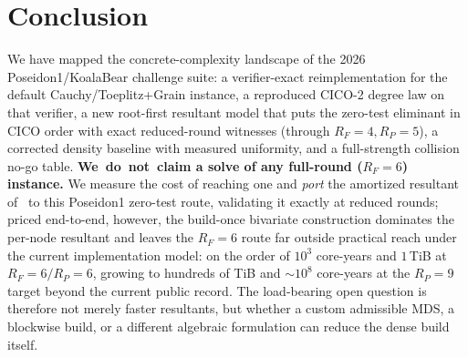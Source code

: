 \documentclass[11pt]{article}
\newcommand{\RF}{R_F}
\newcommand{\RP}{R_P}
\theoremstyle{plain}
\begin{document}
\section{Conclusion}
We have mapped the concrete-complexity landscape of the 2026 Poseidon1/KoalaBear
challenge suite: a verifier-exact reimplementation for the default
Cauchy/Toeplitz+Grain instance, a reproduced CICO-2 degree law on that verifier, a
new root-first resultant model that puts the zero-test eliminant in CICO order with
exact reduced-round witnesses (through
$\RF=4,\RP=5$), a corrected density baseline with measured uniformity, and a
full-strength collision no-go table. \textbf{We~do~not~claim a solve of any
full-round ($\RF=6$) instance.} We measure the cost of reaching one and \emph{port} the amortized resultant
of~\cite{cico2026} to this Poseidon1 zero-test route, validating it exactly at
reduced rounds; priced end-to-end, however, the build-once bivariate construction
dominates the per-node resultant and leaves the $\RF=6$ route far outside practical
reach under the current implementation model: on the order of $10^{3}$ core-years
and $1$\,TiB at $\RF=6/\RP=6$, growing to hundreds of TiB and $\sim 10^{8}$
core-years at the $\RP=9$ target beyond the current public record. The load-bearing open question
is therefore not merely faster resultants, but whether a custom admissible MDS, a
blockwise build, or a different algebraic formulation can reduce the dense build
itself.
\end{document}
